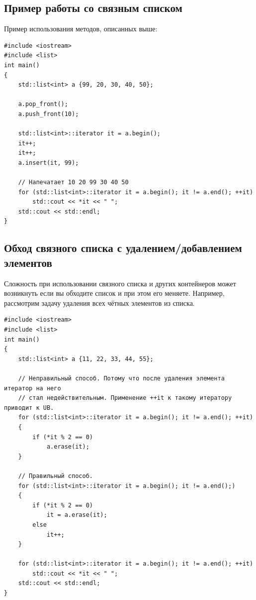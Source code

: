 \documentclass{article}
\begin{document}
\subsection*{Пример работы со связным списком}
Пример использования методов, описанных выше:
\begin{lstlisting}
#include <iostream>
#include <list>
int main()
{
    std::list<int> a {99, 20, 30, 40, 50};
    
    a.pop_front();
    a.push_front(10);
    
    std::list<int>::iterator it = a.begin();
    it++;
    it++;
    a.insert(it, 99);
    
    // Напечатает 10 20 99 30 40 50
    for (std::list<int>::iterator it = a.begin(); it != a.end(); ++it)
        std::cout << *it << " ";
    std::cout << std::endl;    
}
\end{lstlisting}


\subsection*{Обход связного списка с удалением/добавлением элементов}
Сложность при использовании связного списка и других контейнеров может возникнуть если вы обходите список и при этом его меняете. Например, рассмотрим задачу удаления всех чётных элементов из списка.
\begin{lstlisting}
#include <iostream>
#include <list>
int main()
{
    std::list<int> a {11, 22, 33, 44, 55};
    
    // Неправильный способ. Потому что после удаления элемента итератор на него
    // стал недействительным. Применение ++it к такому итератору приводит к UB.
    for (std::list<int>::iterator it = a.begin(); it != a.end(); ++it)
    {
        if (*it % 2 == 0)
            a.erase(it);
    }
    
    // Правильный способ.
    for (std::list<int>::iterator it = a.begin(); it != a.end();)
    {
        if (*it % 2 == 0)
            it = a.erase(it);
        else
            it++;
    }
    
    for (std::list<int>::iterator it = a.begin(); it != a.end(); ++it)
        std::cout << *it << " ";
    std::cout << std::endl;    
}
\end{lstlisting}
\end{document}
